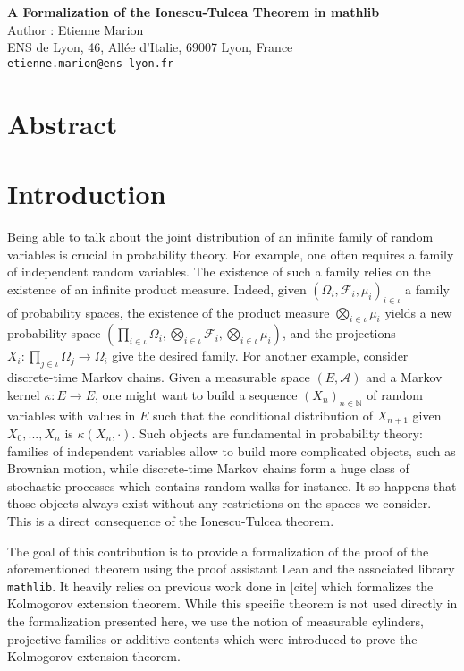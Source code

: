 \documentclass{article}
\newcommand{\A}{\mathcal{A}}
\newcommand{\F}{\mathcal{F}}
\newcommand{\N}{\mathbb{N}}
\newcommand{\mathlib}{\texttt{mathlib}}
\theoremstyle{definition}
\theoremstyle{remark}
\begin{document}
	\begin{center}
		{\Large\bf A Formalization of the Ionescu-Tulcea Theorem in mathlib} \\
		\vspace{1cm}
		Author : Etienne Marion \\
		\vspace{1cm}
		ENS de Lyon, 46, Allée d’Italie, 69007 Lyon, France \\
		\texttt{etienne.marion@ens-lyon.fr}
	\end{center}

	\vspace{0.5cm}

	\section*{Abstract}

	\section{Introduction}
	Being able to talk about the joint distribution of an infinite family of random variables is crucial in probability theory. For example, one often requires a family of independent random variables. The existence of such a family relies on the existence of an infinite product measure. Indeed, given $(\Omega_i, \F_i, \mu_i)_{i\in\iota}$ a family of probability spaces, the existence of the product measure $\bigotimes_{i\in\iota}\mu_i$ yields a new probability space $(\prod_{i\in\iota}\Omega_i, \bigotimes_{i\in\iota}\F_i, \bigotimes_{i\in\iota}\mu_i)$, and the projections $X_i : \prod_{j\in\iota}\Omega_j \to \Omega_i$ give the desired family. For another example, consider discrete-time Markov chains. Given a measurable space $(E, \A)$ and a Markov kernel $\kappa : E \to E$, one might want to build a sequence $(X_n)_{n\in\N}$ of random variables with values in $E$ such that the conditional distribution of $X_{n+1}$ given $X_0, ..., X_n$ is $\kappa(X_n,\cdot)$. Such objects are fundamental in probability theory: families of independent variables allow to build more complicated objects, such as Brownian motion, while discrete-time Markov chains form a huge class of stochastic processes which contains random walks for instance. It so happens that those objects always exist without any restrictions on the spaces we consider. This is a direct consequence of the Ionescu-Tulcea theorem.

	The goal of this contribution is to provide a formalization of the proof of the aforementioned theorem using the proof assistant Lean and the associated library \mathlib. It heavily relies on previous work done in [cite] which formalizes the Kolmogorov extension theorem. While this specific theorem is not used directly in the formalization presented here, we use the notion of measurable cylinders, projective families or additive contents which were introduced to prove the Kolmogorov extension theorem.
\end{document}
